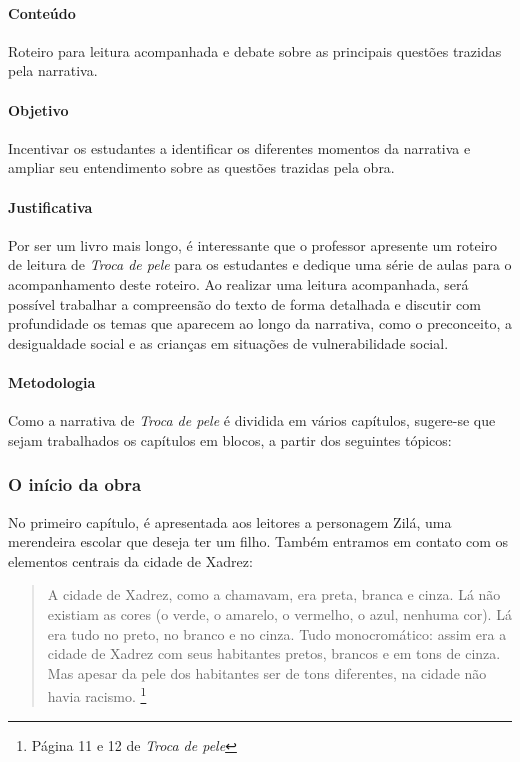 \documentclass[11pt]{extarticle}
\begin{document}
\paragraph{Conteúdo} Roteiro para leitura acompanhada e debate sobre as principais questões trazidas pela narrativa.

\paragraph{Objetivo} Incentivar os estudantes a identificar os diferentes momentos da narrativa e ampliar seu entendimento sobre as questões trazidas pela obra.

\paragraph{Justificativa} Por ser um livro mais longo, é interessante que o professor apresente um roteiro de leitura de \textit{Troca de pele} para os estudantes e dedique uma série de aulas para o acompanhamento deste roteiro. Ao realizar uma leitura acompanhada, será possível trabalhar a compreensão do texto de forma detalhada e discutir com profundidade os temas que aparecem ao longo da narrativa, como o preconceito, a desigualdade social e as crianças em situações de vulnerabilidade social. 

\paragraph{Metodologia} Como a narrativa de \textit{Troca de pele} é dividida em vários capítulos, sugere-se que sejam trabalhados os capítulos em blocos, a partir dos seguintes tópicos:

\subsubsection{O início da obra}

No primeiro capítulo, é apresentada aos leitores a personagem Zilá, uma merendeira escolar que deseja ter um filho. Também entramos em contato com os elementos centrais da cidade de Xadrez:

\begin{quote}A cidade de Xadrez, como a chamavam, era preta, branca e cinza. Lá não existiam as cores (o verde, o amarelo, o vermelho, o azul, nenhuma cor). Lá era tudo no preto, no branco e no cinza. Tudo monocromático: assim era a cidade de Xadrez com seus habitantes pretos, brancos e em tons de cinza. Mas apesar da pele dos habitantes ser de tons diferentes, na cidade não havia racismo. \footnote{Página 11 e 12 de \textit{Troca de pele}}\end{quote}
\end{document}
